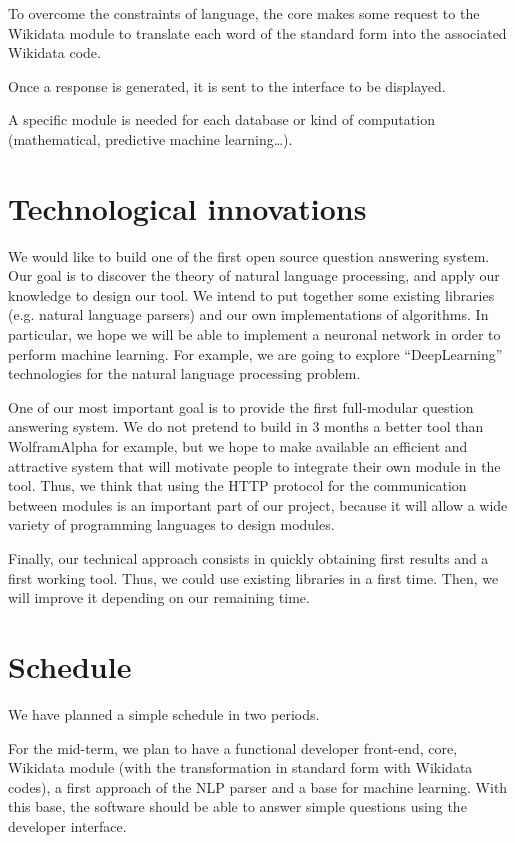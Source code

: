 \documentclass[a4paper,10pt]{article}
\begin{document}
To overcome the constraints of language, the core makes some request to the Wikidata module to translate each word of the standard form into the associated Wikidata code.

Once a response is generated, it is sent to the interface to be displayed.

A specific module is needed for each database or kind of computation (mathematical, predictive machine learning\ldots).

\section{Technological innovations}

We would like to build one of the first open source question answering system. Our goal is to discover the theory of natural language processing, and apply our knowledge to design our tool. We intend to put together some existing libraries (e.g. natural language parsers) and our own implementations of algorithms. In particular, we hope we will be able to implement a neuronal network in order to perform machine learning. For example, we are going to explore ``DeepLearning'' technologies for the natural language processing problem.

One of our most important goal is to provide the first full-modular question answering system. We do not pretend to build in 3 months a better tool than WolframAlpha for example, but we hope to make available an efficient and attractive system that will motivate people to integrate their own module in the tool. Thus, we think that using the HTTP protocol for the communication between modules is an important part of our project, because it will allow a wide variety of programming languages to design modules.

Finally, our technical approach consists in quickly obtaining first results and a first working tool. Thus, we could use existing libraries in a first time. Then, we will improve it depending on our remaining time.

\section{Schedule}

We have planned a simple schedule in two periods.

For the mid-term, we plan to have a functional developer front-end, core, Wikidata module (with the transformation in standard form with Wikidata codes), a first approach of the NLP parser and a base for machine learning. With this base, the software should be able to answer simple questions using the developer interface.
\end{document}
